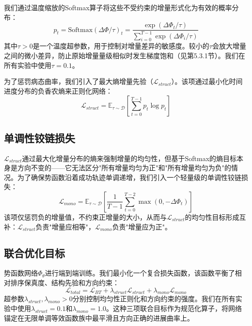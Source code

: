 我们通过温度缩放的Softmax算子将这些不受约束的增量形式化为有效的概率分布：
\begin{equation}
\label{eq:softmax}
    p_t = \text{Softmax}(\Delta\Phi / \tau)_t = \frac{\exp(\Delta\Phi_t / \tau)}{\sum_{i=0}^{T-1} \exp(\Delta\Phi_i / \tau)}
\end{equation}
其中$\tau > 0$是一个温度超参数，用于控制对增量差异的敏感度。较小的$\tau$会放大增量之间的微小差异，防止原始增量量级相似时发生梯度饱和（见第5.3.1节）。我们在所有实验中使用$\tau = 0.1$。

为了惩罚病态曲率，我们引入了最大熵增量先验（$\mathcal{L}_{struct}$）。该项通过最小化时间进度分布的负香农熵来正则化网络：
\begin{equation}
\label{eq:lstruct}
    \mathcal{L}_{struct} = \mathbb{E}_{\tau \sim \mathcal{D}} \left[ \sum_{t=0}^{T-1} p_t \log p_t \right]
\end{equation}

\subsection{单调性铰链损失}

$\mathcal{L}_{struct}$通过最大化增量分布的熵来强制增量的均匀性，但基于Softmax的熵目标本身是方向不变的——它无法区分"所有增量均匀为正"和"所有增量均匀为负"的情况。为了确保势函数沿着成功轨迹单调递增，我们引入一个轻量级的单调性铰链损失：
\begin{equation}
\label{eq:lmono}
    \mathcal{L}_{mono} = \mathbb{E}_{\tau \sim \mathcal{D}} \left[ \frac{1}{T-1}\sum_{t=0}^{T-2} \max(0, -\Delta\Phi_t) \right]
\end{equation}
该项仅惩罚负的增量值，不约束正增量的大小，从而与$\mathcal{L}_{struct}$的均匀性目标形成互补：$\mathcal{L}_{struct}$负责"增量应相等"，$\mathcal{L}_{mono}$负责"增量应为正"。

\subsection{联合优化目标}

势函数网络$\Phi_\theta$进行端到端训练。我们最小化一个复合损失函数，该函数平衡了相对排序保真度、结构先验和方向约束：
\begin{equation}
\label{eq:total_loss}
    \mathcal{L}_{total} = \mathcal{L}_{BT} + \lambda_{struct} \mathcal{L}_{struct} + \lambda_{mono} \mathcal{L}_{mono}
\end{equation}
超参数$\lambda_{struct}, \lambda_{mono} > 0$分别控制均匀性正则化和方向约束的强度。我们在所有实验中使用$\lambda_{struct} = 0.1$和$\lambda_{mono} = 1.0$。这种三项联合目标作为规范化算子，将网络锚定在无限单调等效函数族中最平滑且方向正确的进展曲率上。

